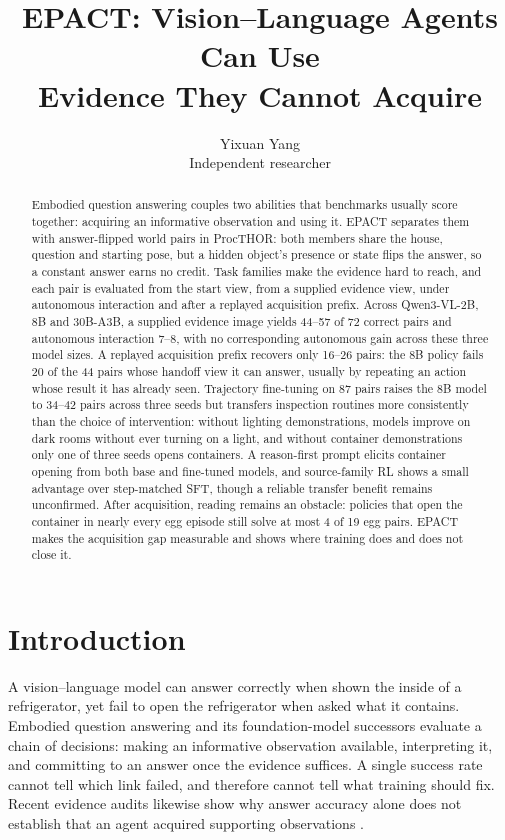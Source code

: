 \documentclass{article}
\title{EPACT: Vision--Language Agents Can Use\\Evidence They Cannot Acquire}
\author{Yixuan Yang\\Independent researcher}
\begin{document}
\maketitle
{}

\begin{abstract}
Embodied question answering couples two abilities that benchmarks usually score together: acquiring an informative observation and using it. EPACT separates them with answer-flipped world pairs in ProcTHOR: both members share the house, question and starting pose, but a hidden object's presence or state flips the answer, so a constant answer earns no credit. Task families make the evidence hard to reach, and each pair is evaluated from the start view, from a supplied evidence view, under autonomous interaction and after a replayed acquisition prefix. Across Qwen3-VL-2B, 8B and 30B-A3B, a supplied evidence image yields 44--57 of 72 correct pairs and autonomous interaction 7--8, with no corresponding autonomous gain across these three model sizes. A replayed acquisition prefix recovers only 16--26 pairs: the 8B policy fails 20 of the 44 pairs whose handoff view it can answer, usually by repeating an action whose result it has already seen. Trajectory fine-tuning on 87 pairs raises the 8B model to 34--42 pairs across three seeds but transfers inspection routines more consistently than the choice of intervention: without lighting demonstrations, models improve on dark rooms without ever turning on a light, and without container demonstrations only one of three seeds opens containers. A reason-first prompt elicits container opening from both base and fine-tuned models, and source-family RL shows a small advantage over step-matched SFT, though a reliable transfer benefit remains unconfirmed. After acquisition, reading remains an obstacle: policies that open the container in nearly every egg episode still solve at most 4 of 19 egg pairs. EPACT makes the acquisition gap measurable and shows where training does and does not close it.
\end{abstract}

\section{Introduction}

A vision--language model can answer correctly when shown the inside of a refrigerator, yet fail to open the refrigerator when asked what it contains. Embodied question answering \citep{das2018embodied,gordon2018iqa} and its foundation-model successors \citep{majumdar2024openeqa} evaluate a chain of decisions: making an informative observation available, interpreting it, and committing to an answer once the evidence suffices. A single success rate cannot tell which link failed, and therefore cannot tell what training should fix. Recent evidence audits likewise show why answer accuracy alone does not establish that an agent acquired supporting observations \citep{garg2026answering}.
\end{document}
